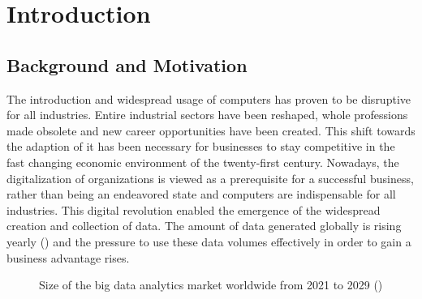 \newpage\section{Introduction}

\subsection{Background and Motivation}

The introduction and widespread usage of computers has proven to be disruptive for all industries. Entire industrial sectors have been reshaped, whole professions made obsolete and new career opportunities have been created. This shift towards the adaption of \ac{it} has been necessary for businesses to stay competitive in the fast changing economic environment of the twenty-first century. Nowadays, the digitalization of organizations is viewed as a prerequisite for a successful business, rather than being an endeavored state and computers are indispensable for all industries. This digital revolution enabled the emergence of the widespread creation and collection of data. The amount of data generated globally is rising yearly (\cite{Seagate.2018}) and the pressure to use these data volumes effectively in order to gain a business advantage rises. 

\begin{figure}[htbp]
    \centering
    \caption[Big data analytics market size]{Size of the big data analytics market worldwide from 2021 to 2029 (\cite{statista.2022})}
    \label{fig:bigDataMarket}
\end{figure}

